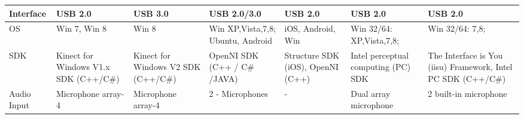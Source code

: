 \begin{landscape}
\begin{table}[H]
\begin{tabularx}{600pt}{c*6{X}}
  \multicolumn{1}{l}{Interface}           & USB 2.0
  										 & USB 3.0
  										 & USB 2.0/3.0 
  										 & USB 2.0
  										 & USB 2.0
  										 & USB 2.0
  										 \tabularnewline\midrule	
  
  \multicolumn{1}{l}{OS}                 & Win 7, Win 8
  										 & Win 8
  										 & Win XP,Vista,7,8; Ubuntu, Android
  										 & iOS, Android, Win
  										 & Win 32/64: XP,Vista,7,8;
  										 & Win 32/64: 7,8; 
  										 \tabularnewline\midrule	
  										 										 								
  
  \multicolumn{1}{l}{SDK}                & Kinect for Windows V1.x SDK (C++/C\#)
  										 & Kinect for Windows V2 SDK (C++/C\#)
  										 & OpenNI SDK (C++ / C\# /JAVA)
  										 & Structure SDK (iOS), OpenNI (C++)
  										 & Intel perceptual computing (PC) SDK 
  										 & The Interface is You (iisu) Framework, Intel PC SDK (C++/C\#)
  										 \tabularnewline\midrule	
  										 
 \multicolumn{1}{l}{Audio Input}        &  Microphone array-4%
  										&  Microphone array-4%
  										&  2 - Microphones 
  										&  - 
  										&  Dual array microphone 
  										&  2 built-in microphone
  										\tabularnewline
  										\bottomrule
\end{tabularx}
\end{table}
\end{landscape}